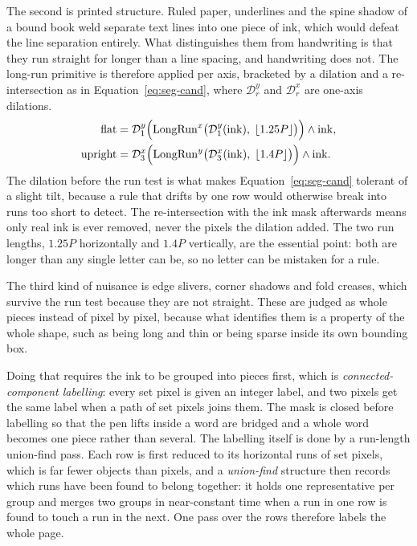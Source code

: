 The second is printed structure. Ruled paper, underlines and the spine shadow of a bound book weld separate text lines into one piece of ink, which would defeat the line separation entirely. What distinguishes them from handwriting is that they run straight for longer than a line spacing, and handwriting does not. The long-run primitive is therefore applied per axis, bracketed by a dilation and a re-intersection as in Equation~\ref{eq:seg-cand}, where $\mathcal D_r^{y}$ and $\mathcal D_r^{x}$ are one-axis dilations.
\begin{equation}
\begin{aligned}
\mathrm{flat}&=\mathcal D_{1}^{y}\Bigl(\mathrm{LongRun}^{x}\bigl(\mathcal D_{1}^{y}(\mathrm{ink}),\;\lfloor1.25P\rfloor\bigr)\Bigr)\wedge\mathrm{ink},\\
\mathrm{upright}&=\mathcal D_{3}^{x}\Bigl(\mathrm{LongRun}^{y}\bigl(\mathcal D_{3}^{x}(\mathrm{ink}),\;\lfloor1.4P\rfloor\bigr)\Bigr)\wedge\mathrm{ink}.
\end{aligned}
\label{eq:seg-cand}
\end{equation}
The dilation before the run test is what makes Equation~\ref{eq:seg-cand} tolerant of a slight tilt, because a rule that drifts by one row would otherwise break into runs too short to detect. The re-intersection with the ink mask afterwards means only real ink is ever removed, never the pixels the dilation added. The two run lengths, $1.25P$ horizontally and $1.4P$ vertically, are the essential point: both are longer than any single letter can be, so no letter can be mistaken for a rule.

The third kind of nuisance is edge slivers, corner shadows and fold creases, which survive the run test because they are not straight. These are judged as whole pieces instead of pixel by pixel, because what identifies them is a property of the whole shape, such as being long and thin or being sparse inside its own bounding box.

Doing that requires the ink to be grouped into pieces first, which is \emph{connected-component labelling}: every set pixel is given an integer label, and two pixels get the same label when a path of set pixels joins them. The mask is closed before labelling so that the pen lifts inside a word are bridged and a whole word becomes one piece rather than several. The labelling itself is done by a run-length union-find pass. Each row is first reduced to its horizontal runs of set pixels, which is far fewer objects than pixels, and a \emph{union-find} structure then records which runs have been found to belong together: it holds one representative per group and merges two groups in near-constant time when a run in one row is found to touch a run in the next. One pass over the rows therefore labels the whole page.

